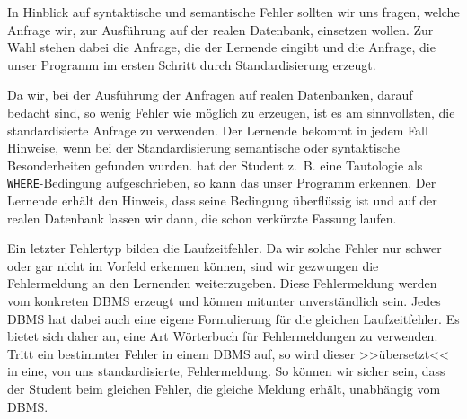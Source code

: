 In Hinblick auf syntaktische und semantische Fehler sollten wir uns fragen, welche Anfrage wir, zur Ausführung auf der realen Datenbank, einsetzen wollen. Zur Wahl stehen dabei die Anfrage, die der Lernende eingibt und die Anfrage, die unser Programm im ersten Schritt durch Standardisierung erzeugt. 

Da wir, bei der Ausführung der Anfragen auf realen Datenbanken, darauf bedacht sind, so wenig Fehler wie möglich zu erzeugen, ist es am sinnvollsten, die standardisierte Anfrage zu verwenden. Der Lernende bekommt in jedem Fall Hinweise, wenn bei der Standardisierung semantische oder syntaktische Besonderheiten gefunden wurden. hat der Student \mbox{z. B.} eine Tautologie als \verb|WHERE|-Bedingung aufgeschrieben, so kann das unser Programm erkennen. Der Lernende erhält den Hinweis, dass seine Bedingung überflüssig ist und auf der realen Datenbank lassen wir dann, die schon verkürzte Fassung laufen. 

Ein letzter Fehlertyp bilden die Laufzeitfehler. Da wir solche Fehler nur schwer oder gar nicht im Vorfeld erkennen können, sind wir gezwungen die Fehlermeldung an den Lernenden weiterzugeben. Diese Fehlermeldung werden vom konkreten DBMS erzeugt und können mitunter unverständlich sein. Jedes DBMS hat dabei auch eine eigene Formulierung für die gleichen Laufzeitfehler. Es bietet sich daher an, eine Art Wörterbuch für Fehlermeldungen zu verwenden. Tritt ein bestimmter Fehler in einem DBMS auf, so wird dieser >>übersetzt<< in eine, von uns standardisierte, Fehlermeldung. So können wir sicher sein, dass der Student beim gleichen Fehler, die gleiche Meldung erhält, unabhängig vom DBMS.
